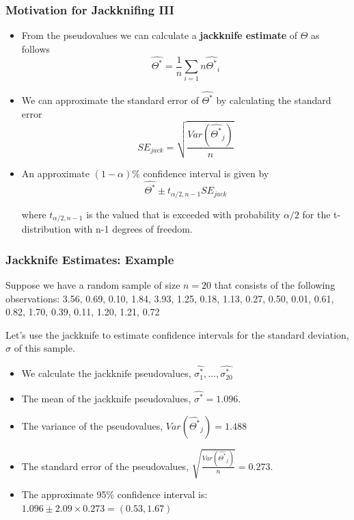 \documentclass{beamer}
\begin{document}
\begin{frame}
  \frametitle{Motivation for Jackknifing III}

\begin{itemize}
    \item From the pseudovalues we can calculate a \textbf{jackknife estimate} of $\Theta$ as follows
\[
\widehat{\Theta^*} = \frac{1}{n} \sum_{i=1}{n}\widehat{\Theta^*}_i
\]

    \item We can approximate the standard error of $\widehat{\Theta^*}$ by calculating the standard error
\[
SE_{jack} = \sqrt{\frac{Var(\widehat{\Theta^*}_j)}{n}}
\]


    \item An approximate $(1-\alpha)$\% confidence interval is given by
\[
\widehat{\Theta^*} \pm t_{\alpha/2, n-1} SE_{jack}
\]

where $t_{\alpha/2, n-1}$ is the valued that is exceeded with probability $\alpha/2$ for the t-distribution with n-1 degrees of freedom.

\end{itemize}

\end{frame}

\begin{frame}
  \frametitle{Jackknife Estimates: Example}

Suppose we have a random sample of size $n=20$ that consists of the following observations: 3.56, 0.69, 0.10, 1.84, 3.93, 1.25, 0.18, 1.13, 0.27, 0.50, 0.01, 0.61, 0.82, 1.70, 0.39, 0.11, 1.20, 1.21, 0.72
\medskip

Let's use the jackknife to estimate confidence intervals for the standard deviation, $\sigma$ of this sample.

\begin{itemize}
    \item We calculate the jackknife pseudovalues, $\widehat{\sigma^*_1}, \ldots, \widehat{\sigma^*_{20}}$
    \item The mean of the jackknife pseudovalues, $\widehat{\sigma^*} = 1.096$.
    \item The variance of the pseudovalues, $Var(\widehat{\Theta^*}_j) = 1.488$
    \item The standard error of the pseudovalues, $\sqrt{\frac{Var(\widehat{\Theta^*}_j)}{n}} = 0.273$.
    \item The approximate 95\% confidence interval is: $1.096 \pm 2.09 \times 0.273 = (0.53, 1.67)$

\end{itemize}



\end{frame}
\end{document}
